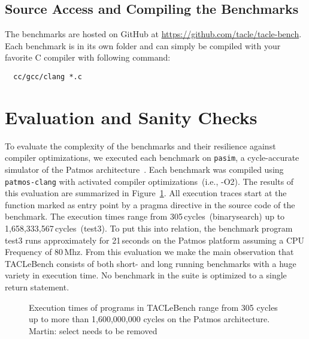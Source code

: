 \documentclass[a4paper,UKenglish]{oasics}
\newcommand{\martin}[1]{{\color{blue} Martin: #1}}
\begin{document}
\subsection{Source Access and Compiling the Benchmarks}

The benchmarks are hosted on GitHub at \url{https://github.com/tacle/tacle-bench}.
Each benchmark is in its own folder and can simply be compiled with your favorite
C compiler with following command:

\begin{verbatim}
  cc/gcc/clang *.c
\end{verbatim}


\section{Evaluation and Sanity Checks}
\label{sec:eval}
To evaluate the complexity of the benchmarks and their resilience against 
compiler optimizations, we executed each benchmark on \texttt{pasim}, a 
cycle-accurate simulator of the Patmos architecture~\cite{t-crest:2015}. Each 
benchmark was compiled using \texttt{patmos-clang} with activated compiler 
optimizations~(i.e., -O2). The results of this evaluation are summarized in 
Figure~\ref{fig:execution-times}. All execution traces start at the function 
marked as entry point by a pragma directive in the source code of the benchmark.
The execution times range from 305\,cycles~(binarysearch) up to 
1,658,333,567\,cycles~(test3).
To put this into relation, the benchmark program test3 runs approximately 
for 21\,seconds on the Patmos platform assuming a CPU Frequency of 80\,Mhz.
From this evaluation we make the main observation that 
TACLeBench consists of both short- and long running benchmarks with a huge variety in execution time. 
No benchmark in the suite is optimized to a single return statement.

\begin{figure}[t]
  \def\resultfile{eval/wcet.csv}
  
  \caption{Execution times of programs in TACLeBench range from 305 cycles up to more than 1,600,000,000 cycles on the Patmos architecture. \martin{select needs to be removed}}
  \label{fig:execution-times}
\end{figure}
\end{document}
